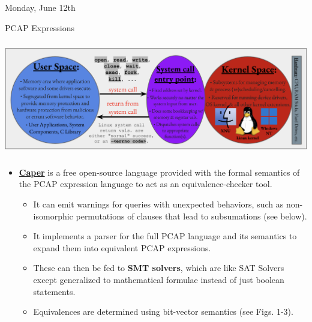 \documentclass[11pt]{article}
\begin{document}
\begin{shininggoldbox}{Monday, June 12th\vspace{-2.2em}\begin{flushright}\large PCAP Expressions \end{flushright}}
\begin{itemize}
        \vspace{0.25em}
    \end{itemize}
    \vspace{-3em}
    \begin{center}
        \includegraphics[width = 15.5cm, height = 5cm]{User and Kernel Space.png}
    \end{center}
    \vspace{-2em}
    \begin{itemize}
        \item\href{https://gitlab.com/niksu/caper}{\textbf{Caper}} is a free open-source language provided with the formal semantics of the PCAP expression language to act as an equivalence-checker tool.
        \vspace{-0.75em}
        \begin{itemize}
            \item It can emit warnings for queries with unexpected behaviors, such as non-isomorphic permutations of clauses that lead to subsumations (see below).
            \item It implements a parser for the full PCAP language and its semantics to expand them into equivalent PCAP expressions.
            \item These can then be fed to \textbf{SMT solvers}, which are like SAT Solvers except generalized to mathematical formulae instead of just boolean statements.
            \item Equivalences are determined using bit-vector semantics (see Figs. 1-3).
        \end{itemize}
    \end{itemize}
\end{shininggoldbox}

\begin{center}
    \vspace{-0.25em}
    \hspace{0.2cm}
    \vspace{-0.4em}
\end{center}
\end{document}
